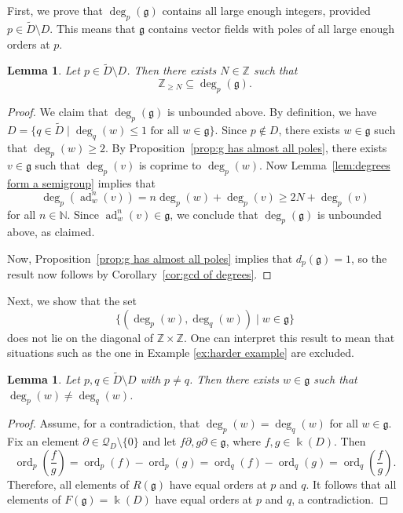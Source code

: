 \documentclass[12pt]{amsart}
\theoremstyle{plain}
\newtheorem{lemma}[theorem]{Lemma}
\theoremstyle{definition}
\numberwithin{equation}{section}
\def\g{\mathfrak{g}}
\def\Q{\mathcal{Q}}
\def\NN{\mathbb{N}}
\def\ZZ{\mathbb{Z}}
\def\kk{\Bbbk}
\DeclareMathOperator{\ord}{ord}
\DeclareMathOperator{\ad}{ad}
\def\del{\partial}
\def\nonzero{\setminus \{0\}}
\begin{document}
First, we prove that $\deg_p(\g)$ contains all large enough integers, provided $p \in \widetilde{D} \setminus D$. This means that $\g$ contains vector fields with poles of all large enough orders at $p$.

\begin{lemma}\label{lem:poles can be arbitrarily large}
    Let $p \in \widetilde{D} \setminus D$. Then there exists $N \in \ZZ$ such that
    $$\ZZ_{\geq N} \subseteq \deg_p(\g).$$
\end{lemma}
\begin{proof}
    We claim that $\deg_p(\g)$ is unbounded above. By definition, we have $D = \{q \in \widetilde{D} \mid \deg_q(w) \leq 1 \text{ for all } w \in \g\}$. Since $p \notin D$, there exists $w \in \g$ such that $\deg_p(w) \geq 2$. By Proposition~\ref{prop:g has almost all poles}, there exists $v \in \g$ such that $\deg_p(v)$ is coprime to $\deg_p(w)$. Now Lemma~\ref{lem:degrees form a semigroup} implies that
    $$\deg_p(\ad_w^n(v)) = n \deg_p(w) + \deg_p(v) \geq 2N + \deg_p(v)$$
    for all $n \in \NN$. Since $\ad_w^n(v) \in \g$, we conclude that $\deg_p(\g)$ is unbounded above, as claimed.

    Now, Proposition~\ref{prop:g has almost all poles} implies that $d_p(\g) = 1$, so the result now follows by Corollary~\ref{cor:gcd of degrees}.
\end{proof}

Next, we show that the set
$$\{(\deg_p(w), \deg_q(w)) \mid w \in \g\}$$
does not lie on the diagonal of $\ZZ \times \ZZ$. One can interpret this result to mean that situations such as the one in Example \ref{ex:harder example} are excluded.

\begin{lemma}\label{lem:degrees at different points are different}
    Let $p,q \in \widetilde{D} \setminus D$ with $p \neq q$. Then there exists $w \in \g$ such that $\deg_p(w) \neq \deg_q(w)$.
\end{lemma}
\begin{proof}
    Assume, for a contradiction, that $\deg_p(w) = \deg_q(w)$ for all $w \in \g$. Fix an element $\del \in \Q_D \nonzero$ and let $f\del, g\del \in \g$, where $f, g \in \kk(D)$. Then
    $$\ord_p\left(\frac{f}{g}\right) = \ord_p(f) - \ord_p(g) = \ord_q(f) - \ord_q(g) = \ord_q\left(\frac{f}{g}\right).$$
    Therefore, all elements of $R(\g)$ have equal orders at $p$ and $q$. It follows that all elements of $F(\g) = \kk(D)$ have equal orders at $p$ and $q$, a contradiction.
\end{proof}
\end{document}
